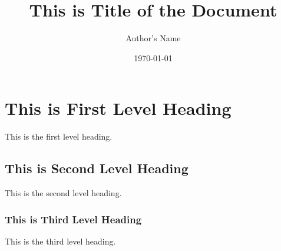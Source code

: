 \documentclass[12pt, letter]{article}
\title{This is Title of the Document}
\author{Author's Name}
\date{\today}
\begin{document}
\begin{titlepage}
 \maketitle
 \thispagestyle{empty}
\end{titlepage}

\section{This is First Level Heading}
This is the first level heading.

\subsection{This is Second Level Heading}
This is the second level heading.

\subsubsection{This is Third Level Heading}
This is the third level heading.
\end{document}
